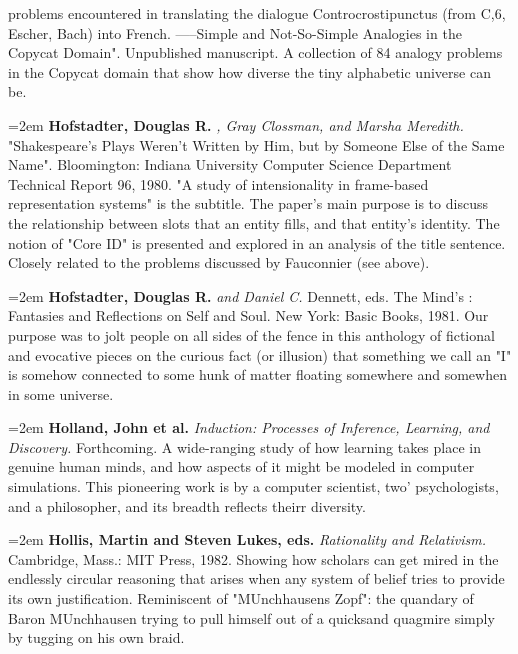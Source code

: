 problems encountered in translating the dialogue Controcrostipunctus (from C,6, Escher, Bach) into French. -----Simple and Not-So-Simple Analogies in the Copycat Domain". Unpublished manuscript. A collection of 84 analogy problems in the Copycat domain that show how diverse the tiny alphabetic universe can be.

\par\noindent\hangindent=2em {\bf Hofstadter, Douglas R.} {\it , Gray Clossman, and Marsha Meredith.} "Shakespeare's Plays Weren't Written by Him, but by Someone Else of the Same Name". Bloomington: Indiana University Computer Science Department Technical Report 96, 1980. "A study of intensionality in frame-based representation systems" is the subtitle. The paper's main purpose is to discuss the relationship between slots that an entity fills, and that entity's identity. The notion of "Core ID" is presented and explored in an analysis of the title sentence. Closely related to the problems discussed by Fauconnier (see above).

\par\noindent\hangindent=2em {\bf Hofstadter, Douglas R.} {\it and Daniel C.} Dennett, eds. The Mind's : Fantasies and Reflections on Self and Soul. New York: Basic Books, 1981. Our purpose was to jolt people on all sides of the fence in this anthology of fictional and evocative pieces on the curious fact (or illusion) that something we call an "I" is somehow connected to some hunk of matter floating somewhere and somewhen in some universe.

\par\noindent\hangindent=2em {\bf Holland, John et al.} {\it Induction: Processes of Inference, Learning, and Discovery.} Forthcoming. A wide-ranging study of how learning takes place in genuine human minds, and how aspects of it might be modeled in computer simulations. This pioneering work is by a computer scientist, two' psychologists, and a philosopher, and its breadth reflects theirr diversity.

\par\noindent\hangindent=2em {\bf Hollis, Martin and Steven Lukes, eds.} {\it Rationality and Relativism.} Cambridge, Mass.: MIT Press, 1982. Showing how scholars can get mired in the endlessly circular reasoning that arises when any system of belief tries to provide its own justification. Reminiscent of "MUnchhausens Zopf": the quandary of Baron MUnchhausen trying to pull himself out of a quicksand quagmire simply by tugging on his own braid.

